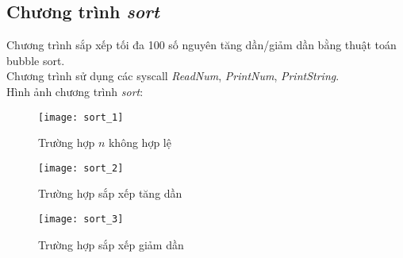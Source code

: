 \subsection{Chương trình \textit{sort}}
Chương trình sắp xếp tối đa 100 số nguyên tăng dần/giảm dần bằng thuật toán bubble sort.\\
Chương trình sử dụng các syscall \textit{ReadNum}, \textit{PrintNum}, \textit{PrintString}.\\
Hình ảnh chương trình \textit{sort}:
\begin{figure}[H]
\begin{center}
\texttt{[image: sort\_1]}
\end{center}
\caption{Trường hợp $n$ không hợp lệ}
\end{figure}

\begin{figure}[H]
\begin{center}
\texttt{[image: sort\_2]}
\end{center}
\caption{Trường hợp sắp xếp tăng dần}
\end{figure}

\begin{figure}[H]
\begin{center}
\texttt{[image: sort\_3]}
\end{center}
\caption{Trường hợp sắp xếp giảm dần}
\end{figure}